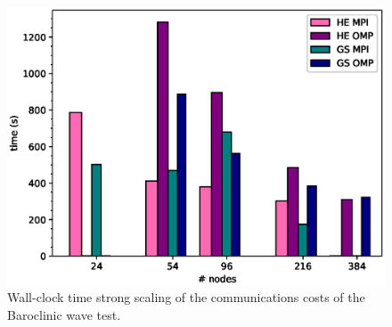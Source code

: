 \begin{figure}
\centering\includegraphics[width=1.0\linewidth]{figs/comms-scale.eps}
\caption{\label{fig:comns_scale}Wall-clock time strong scaling of the 
  communications costs of the Baroclinic wave test.}
\end{figure} 

